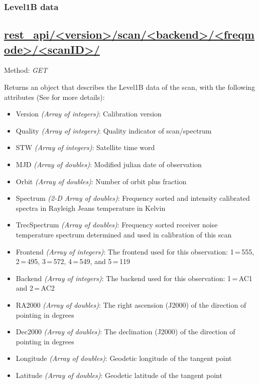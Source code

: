 \subsubsection{Level1B data}
\subsection*{\url{rest_api/<version>/scan/<backend>/<freqmode>/<scanID>/}}
Method: \emph{GET}

Returns an object that describes the Level1B data of the scan,
with the following attributes (See \citet{atbdl1b} for more details):

\begin{itemize}

  \item Version \emph{(Array of integers)}: Calibration version
  \item Quality \emph{(Array of integers)}: Quality indicator of scan/spectrum
  \item STW \emph{(Array of integers)}: Satellite time word
  \item MJD \emph{(Array of doubles)}: Modified julian date of observation
  \item Orbit \emph{(Array of doubles)}: Number of orbit plus fraction
  \item Spectrum \emph{(2-D Array of doubles)}: Frequency sorted and intensity calibrated spectra
                       in Rayleigh Jeans temperature in Kelvin
  \item TrecSpectrum \emph{(Array of doubles)}: Frequency sorted receiver noise temperature spectrum
                       determined and used in calibration of this scan
  \item Frontend \emph{(Array of integers)}: The frontend used for this observation: 1\,=\,555, 2\,=\,495, 
                       3\,=\,572, 4\,=\,549, and 5\,=\,119
  \item Backend \emph{(Array of integers)}: The backend used for this observation: 1\,=\,AC1 and 2\,=\,AC2
  \item RA2000 \emph{(Array of doubles)}: The right ascension (J2000) of the direction of pointing in degrees
  \item Dec2000 \emph{(Array of doubles)}: The declination (J2000) of the direction of pointing in degrees
  \item Longitude \emph{(Array of doubles)}: Geodetic longitude of the tangent point
  \item Latitude \emph{(Array of doubles)}: Geodetic latitude of the tangent point

\end{itemize}
